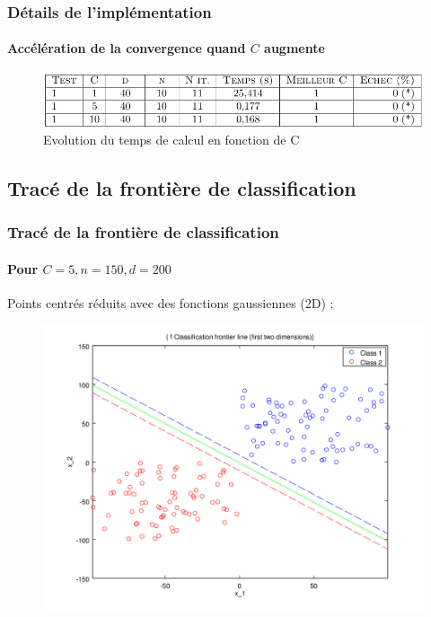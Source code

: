 \documentclass{beamer}
\begin{document}
\begin{frame}
\frametitle{Détails de l'implémentation}
\framesubtitle{Accélération de la convergence quand $C$ augmente}


         \begin{figure}
         \centering
         \caption{Evolution du temps de calcul en fonction de C}
         \includegraphics[scale=0.4]{images/tabl1.png}
         \end{figure}

\end{frame}

\subsection{Tracé de la frontière de classification}

\begin{frame}
\tableofcontents[currentsubsection]
\end{frame}

\begin{frame}
\frametitle{Tracé de la frontière de classification}
\framesubtitle{Pour $C = 5, n = 150, d = 200$}

Points centrés réduits avec des fonctions gaussiennes (2D) :

         \begin{figure}
         \centering
         \includegraphics[scale=0.4]{images/line4.png}
         \end{figure}

\end{frame}
\end{document}
